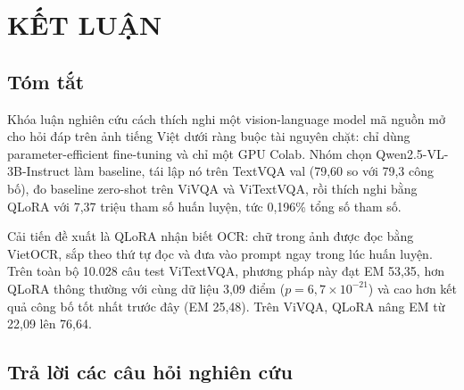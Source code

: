 
\chapter{KẾT LUẬN}
\label{chap:conclusion}

\ifpdf
    \graphicspath{{Chapter8/Figs/Raster/}{Chapter8/Figs/PDF/}{Chapter8/Figs/}}
\else
    \graphicspath{{Chapter8/Figs/Vector/}{Chapter8/Figs/}}
\fi

\section{Tóm tắt}
\label{sec:con-summary}

Khóa luận nghiên cứu cách thích nghi một vision-language model mã nguồn mở cho
hỏi đáp trên ảnh tiếng Việt dưới ràng buộc tài nguyên chặt: chỉ dùng
parameter-efficient fine-tuning và chỉ một GPU Colab. Nhóm chọn
Qwen2.5-VL-3B-Instruct làm baseline, tái lập nó trên TextVQA val (79,60 so với
79,3 công bố), đo baseline zero-shot trên ViVQA và ViTextVQA, rồi thích nghi bằng
QLoRA với 7,37 triệu tham số huấn luyện, tức 0,196\% tổng số tham số.

Cải tiến đề xuất là QLoRA nhận biết OCR: chữ trong ảnh được đọc bằng VietOCR,
sắp theo thứ tự đọc và đưa vào prompt ngay trong lúc huấn luyện. Trên toàn bộ
10.028 câu test ViTextVQA, phương pháp này đạt EM 53,35, hơn QLoRA thông thường
với cùng dữ liệu 3,09 điểm ($p = 6{,}7\times10^{-21}$) và cao hơn kết quả công bố
tốt nhất trước đây (EM 25,48). Trên ViVQA, QLoRA nâng EM từ 22,09 lên 76,64.

\section{Trả lời các câu hỏi nghiên cứu}
\label{sec:con-rq}

